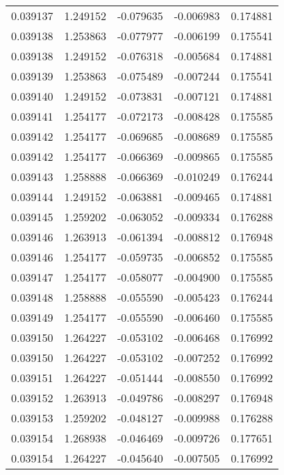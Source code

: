\begin{tabular}{lrrrr}
0.039137    &  1.249152 & -0.079635 & -0.006983 &             0.174881 \\
0.039138    &  1.253863 & -0.077977 & -0.006199 &             0.175541 \\
0.039138    &  1.249152 & -0.076318 & -0.005684 &             0.174881 \\
0.039139    &  1.253863 & -0.075489 & -0.007244 &             0.175541 \\
0.039140    &  1.249152 & -0.073831 & -0.007121 &             0.174881 \\
0.039141    &  1.254177 & -0.072173 & -0.008428 &             0.175585 \\
0.039142    &  1.254177 & -0.069685 & -0.008689 &             0.175585 \\
0.039142    &  1.254177 & -0.066369 & -0.009865 &             0.175585 \\
0.039143    &  1.258888 & -0.066369 & -0.010249 &             0.176244 \\
0.039144    &  1.249152 & -0.063881 & -0.009465 &             0.174881 \\
0.039145    &  1.259202 & -0.063052 & -0.009334 &             0.176288 \\
0.039146    &  1.263913 & -0.061394 & -0.008812 &             0.176948 \\
0.039146    &  1.254177 & -0.059735 & -0.006852 &             0.175585 \\
0.039147    &  1.254177 & -0.058077 & -0.004900 &             0.175585 \\
0.039148    &  1.258888 & -0.055590 & -0.005423 &             0.176244 \\
0.039149    &  1.254177 & -0.055590 & -0.006460 &             0.175585 \\
0.039150    &  1.264227 & -0.053102 & -0.006468 &             0.176992 \\
0.039150    &  1.264227 & -0.053102 & -0.007252 &             0.176992 \\
0.039151    &  1.264227 & -0.051444 & -0.008550 &             0.176992 \\
0.039152    &  1.263913 & -0.049786 & -0.008297 &             0.176948 \\
0.039153    &  1.259202 & -0.048127 & -0.009988 &             0.176288 \\
0.039154    &  1.268938 & -0.046469 & -0.009726 &             0.177651 \\
0.039154    &  1.264227 & -0.045640 & -0.007505 &             0.176992 \\

\end{tabular}
